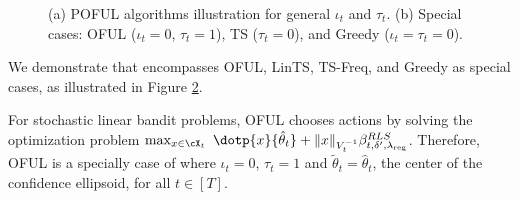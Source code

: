 \begin{figure}[!b]
\begin{subfigure}[]{0.48\textwidth}
	\caption{}
	\label{fig:POFUL_special_cases}
 \end{subfigure}
 \caption{(a) POFUL algorithms illustration for general $\iota_t$ and  $\tau_t$. (b) Special cases: OFUL ($\iota_t = 0$, $\tau_t = 1$), TS ($\tau_t = 0$), and Greedy ($\iota_t = \tau_t = 0$).}
\end{figure}


We demonstrate that \POFUL{} encompasses OFUL, LinTS, TS-Freq, and Greedy as special cases, as illustrated in Figure \ref{fig:POFUL_special_cases}.
%
\begin{example}[OFUL]\label{ex:oful}
	For stochastic linear bandit problems, OFUL chooses actions by solving the optimization problem 
	$
	\max_{x\in\cX_t}  \   \dotp{x}{ \hat{\theta}_t}  + \|x\|_{V_t^{-1}}   \beta_{t,\delta^\prime, \lambdareg}^{RLS}
	$.
	Therefore, OFUL is a specially case of \POFUL{} where $\iota_t = 0$, $\tau_t = 1$ and $
	\tilde{\theta}_t = \hat{\theta}_t$, the center of the confidence ellipsoid, for all $t\in[T]$.
\end{example}

